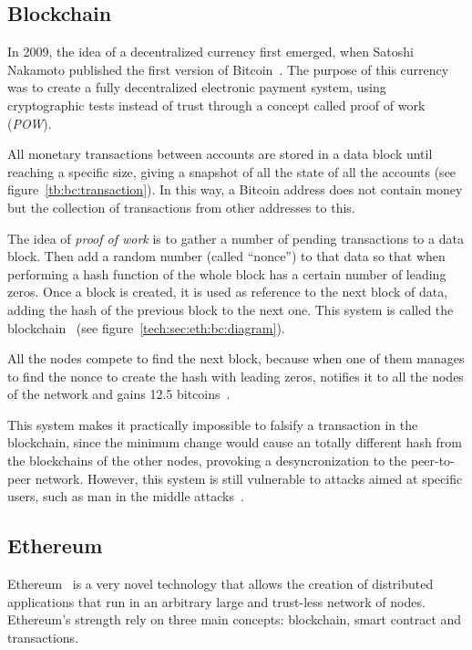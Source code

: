 \subsection{Blockchain}
\label{tb:bc}


In 2009, the idea of a decentralized currency first emerged, when Satoshi
Nakamoto published the first version of Bitcoin~\cite{nakamoto2008bitcoin}. The
purpose of this currency was to create a fully decentralized electronic payment
system, using cryptographic tests instead of trust through a concept called
proof of work (\emph{POW}).

All monetary transactions between accounts are stored in a data block until
reaching a specific size, giving a snapshot of all the state of all the accounts
(see figure~\ref{tb:bc:transaction}). In this way, a Bitcoin address does not
contain money but the collection of transactions from other addresses to this.

The idea of \emph{proof of work} is to gather a number of pending transactions
to a data block. Then add a random number (called ``nonce'') to that data so
that when performing a hash function of the whole block has a certain number of
leading zeros. Once a block is created, it is used as reference to the next
block of data, adding the hash of the previous block to the next one. This
system is called the blockchain~\cite{antonopoulos2014mastering} (see
figure~\ref{tech:sec:eth:bc:diagram}).


All the nodes compete to find the next block, because when one of them manages
to find the nonce to create the hash with leading zeros, notifies it to all the
nodes of the network and gains 12.5 bitcoins~\cite{barber2012bitter}.

This system makes it practically impossible to falsify a transaction in the
blockchain, since the minimum change would cause an totally different hash from
the blockchains of the other nodes, provoking a desyncronization to the
peer-to-peer network. However, this system is still vulnerable to attacks aimed
at specific users, such as man in the middle attacks~\cite{moore2013beware}.

\subsection{Ethereum}
\label{tb:eth}
Ethereum~\cite{buterin2014ethereum} is a very novel technology that allows the
creation of distributed applications that run in an arbitrary large and
trust-less network of nodes. Ethereum's strength rely on three main concepts:
blockchain, smart contract and transactions.

